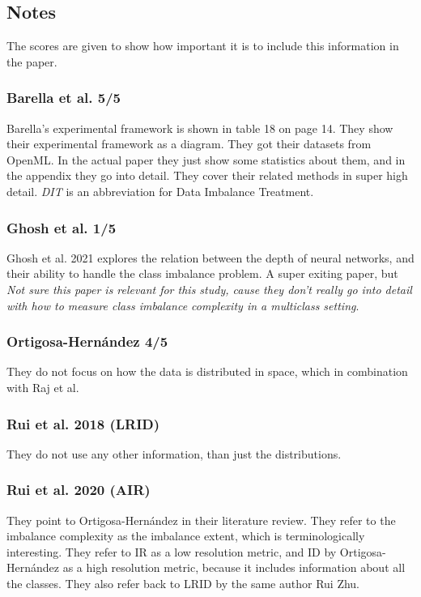 \subsection*{Notes}
The scores are given to show how important it is to include this information in the paper. 
\subsubsection*{Barella et al. 5/5}
Barella's experimental framework is shown in table 18 on page 14. They show their experimental framework as a diagram. They got their datasets from OpenML. In the actual paper they just show some statistics about them, and in the appendix they go into detail. 
They cover their related methods in super high detail. \emph{DIT} is an abbreviation for Data Imbalance Treatment. 
\subsubsection*{Ghosh et al. 1/5}
Ghosh et al. 2021 explores the relation between the depth of neural networks, and their ability to handle the class imbalance problem. A super exiting paper, but \emph{Not sure this paper is relevant for this study, cause they don't really go into detail with how to measure class imbalance complexity in a multiclass setting}. 
\subsubsection*{Ortigosa-Hernández 4/5} 
They do not focus on how the data is distributed in space, which in combination with Raj et al.  
\subsubsection*{Rui et al. 2018 (LRID)}
They do not use any other information, than just the distributions.
\subsubsection*{Rui et al. 2020 (AIR)} 
They point to Ortigosa-Hernández in their literature review. They refer to the imbalance complexity as the imbalance extent, which is terminologically interesting. They refer to IR as a low resolution metric, and ID by Ortigosa-Hernández as a high resolution metric, because it includes information about all the classes. They also refer back to LRID \cite{DBLP:journals/prl/ZhuWMWX18} by the same author Rui Zhu.
